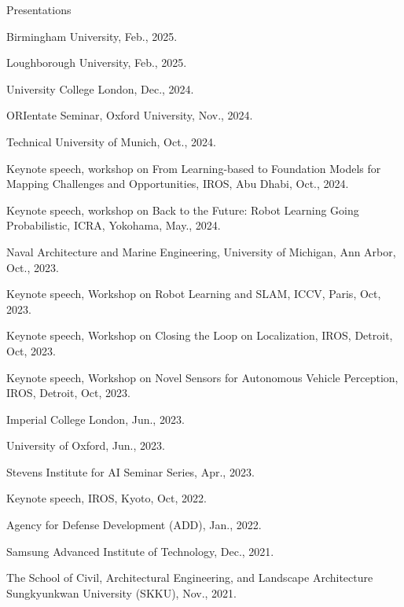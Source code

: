 \begin{rSection}{Presentations}
\begin{pubSubsectionNum}{}
  \item Birmingham University, Feb., 2025.
  
  \item Loughborough University, Feb., 2025.

  \item University College London, Dec., 2024.

  \item ORIentate Seminar, Oxford University, Nov., 2024.

  \item Technical University of Munich, Oct., 2024.

  \item Keynote speech, workshop on From Learning-based to Foundation Models for Mapping Challenges and Opportunities, IROS, Abu Dhabi, Oct., 2024.

  \item Keynote speech, workshop on Back to the Future: Robot Learning Going Probabilistic, ICRA, Yokohama, May., 2024.

  \item Naval Architecture and Marine Engineering, University of Michigan, Ann Arbor, Oct., 2023.

  \item Keynote speech, Workshop on Robot Learning and SLAM, ICCV, Paris, Oct, 2023.

  \item Keynote speech, Workshop on Closing the Loop on Localization, IROS, Detroit, Oct, 2023.

  \item Keynote speech, Workshop on Novel Sensors for Autonomous Vehicle Perception, IROS, Detroit, Oct, 2023.

  \item Imperial College London, Jun., 2023.

  \item University of Oxford, Jun., 2023.

  \item Stevens Institute for AI Seminar Series, Apr., 2023.

  \item Keynote speech, IROS, Kyoto, Oct, 2022.

  \item Agency for Defense Development (ADD), Jan., 2022.

  \item Samsung Advanced Institute of Technology, Dec., 2021.

  \item The School of Civil, Architectural Engineering, and Landscape Architecture
Sungkyunkwan University (SKKU), Nov., 2021.


\end{pubSubsectionNum}
\end{rSection}
